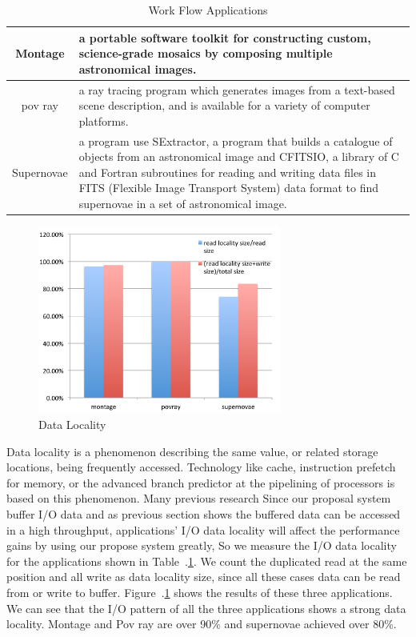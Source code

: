 \begin{table}
\centering
\begin{tabular}{|c|p{150pt}|}
\hline
Montage		&		a portable software toolkit for constructing custom, science-grade 
mosaics by composing multiple astronomical images\cite{montage}.\\\hline
pov ray		&		a ray tracing program which generates images from a text-based scene description, and is
available for a variety of computer platforms\cite{povray}.\\\hline
Supernovae	&	a program use SExtractor\cite{SExtractor}, a program that builds a catalogue of objects
from an astronomical image and CFITSIO\cite{fitsio},  a library of C and Fortran subroutines for
reading and writing data files in FITS (Flexible Image Transport System) data format to find supernovae in a set of
astronomical image.\\
\hline
\end{tabular}
\caption{Work Flow Applications}
\label{background:work flow applications}
\end{table}

\begin{figure}
\centering
\includegraphics[width=8cm]{img/data_locality.pdf}
\caption{Data Locality}
\label{background:data locality}
\end{figure}

Data locality is a phenomenon describing the same value, or related storage locations, being
frequently accessed.
Technology like cache, instruction prefetch for memory, or the advanced branch predictor
at the pipelining of processors is based on this phenomenon.
Many previous research 
Since our proposal system buffer I/O data and as previous section shows the buffered data can be
accessed in a high throughput, applications' I/O data locality will affect the performance gains by
using our propose system greatly, So we measure the I/O data locality for the applications shown in
Table~.\ref{background:work flow applications}.
We count the duplicated read at the same position and all write as data locality size, since all
these cases data can be read from or write to buffer.
Figure~.\ref{background:data locality} shows the results of these three applications.
We can see
that the I/O pattern of all the three applications shows a strong data locality. Montage and Pov ray
are over 90\% and supernovae achieved over 80\%.

